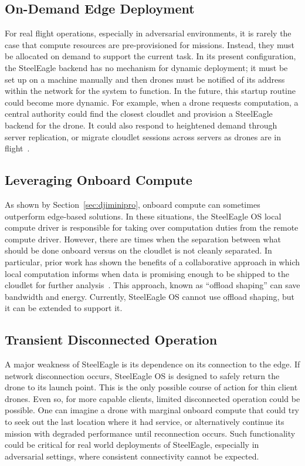 \subsection{On-Demand Edge Deployment}
For real flight operations, especially in adversarial environments, it is rarely the case that compute resources are pre-provisioned for missions. Instead, they must be allocated on demand to support the current task. In its present configuration, the SteelEagle backend has no mechanism for dynamic deployment; it must be set up on a machine manually and then drones must be notified of its address within the network for the system to function. In the future, this startup routine could become more dynamic. For example, when a drone requests computation, a central authority could find the closest cloudlet and provision a SteelEagle backend for the drone. It could also respond to heightened demand through server replication, or migrate cloudlet sessions across servers as drones are in flight~\cite{Ha2013}.

\subsection{Leveraging Onboard Compute}
As shown by Section~\ref{sec:djiminipro}, onboard compute can sometimes outperform edge-based solutions. In these situations, the SteelEagle OS local compute driver is responsible for taking over computation duties from the remote compute driver. However, there are times when the separation between what should be done onboard versus on the cloudlet is not cleanly separated. In particular, prior work has shown the benefits of a collaborative approach in which local computation informs when data is promising enough to be shipped to the cloudlet for further analysis~\cite{Iyengar2023,Wang2017}. This approach, known as ``offload shaping'' can save bandwidth and energy. Currently, SteelEagle OS cannot use offload shaping, but it can be extended to support it. 

\subsection{Transient Disconnected Operation}
A major weakness of SteelEagle is its dependence on its connection to the edge. If network disconnection occurs, SteelEagle OS is designed to safely return the drone to its launch point. This is the only possible course of action for thin client drones. Even so, for more capable clients, limited disconnected operation could be possible. One can imagine a drone with marginal onboard compute that could try to seek out the last location where it had service, or alternatively continue its mission with degraded performance until reconnection occurs. Such functionality could be critical for real world deployments of SteelEagle, especially in adversarial settings, where consistent connectivity cannot be expected.

